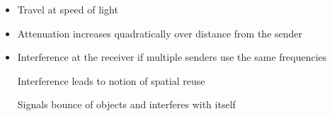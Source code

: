 \begin{itemize}
        \begin{itemize}
            \item Travel at speed of light
            \item Attenuation increases quadratically over distance from the sender
            \item Interference at the receiver if multiple senders use the same frequencies
                \begin{itemize}
                     Interference leads to notion of spatial reuse
                \end{itemize}
             Signals bounce of objects and interferes with itself
        \end{itemize}
\end{itemize}


